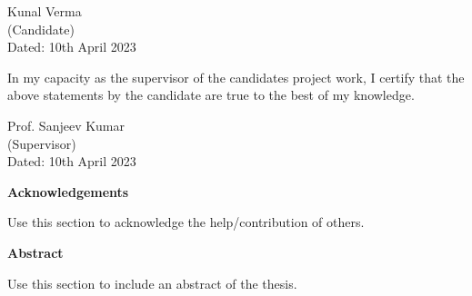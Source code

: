 \documentclass[a4paper,12pt]{report}
\numberwithin{equation}{section}
\begin{document}
\begin{flushright}
Kunal Verma
\\
(Candidate)
\\
Dated: 10th April 2023
\end{flushright}

In my capacity as the supervisor of the candidates project work, I certify that the above statements by the candidate are true to the best of my knowledge.

\vspace{2cm}

\begin{flushright}
Prof. Sanjeev Kumar
\\
(Supervisor)
\\
Dated: 10th April 2023
\end{flushright}

\cleardoublepage

\begin{center}
\textbf{\Large Acknowledgements}
\end{center}

Use this section to acknowledge the help/contribution of others.


\newpage
\begin{center}
    \textbf{\Large Abstract}
\end{center}

Use this section to include an abstract of the thesis.

\newpage
\restoregeometry

\listoffigures

\newpage

\tableofcontents
{} 
\newpage


\newpage
\newpage
\newpage
\newpage
\printbibliography
\end{document}

